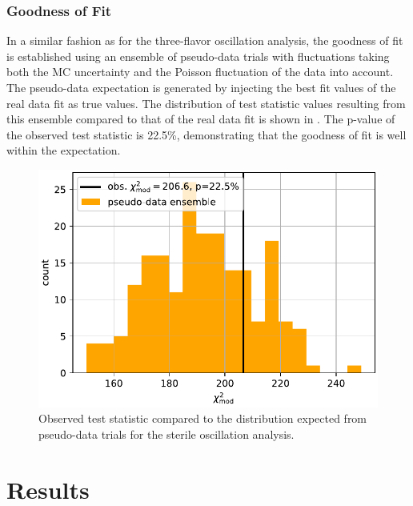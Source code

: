 \subsubsection{Goodness of Fit}
In a similar fashion as for the three-flavor oscillation analysis, the goodness of fit is established using an ensemble of pseudo-data trials with fluctuations taking both the MC uncertainty and the Poisson fluctuation of the data into account.
The pseudo-data expectation is generated by injecting the best fit values of the real data fit as true values.
The distribution of test statistic values resulting from this ensemble compared to that of the real data fit is shown in .
The p-value of the observed test statistic is 22.5\%, demonstrating that the goodness of fit is well within the expectation.

\begin{figure}
    \centering
    \includegraphics[width=0.8\linewidth]{figures/measurement/sterile_analysis/results/compare_ts_to_ensemble_REAL_DATA_FIT_v12_ext_holeice.pdf}
    \caption{Observed test statistic compared to the distribution expected from pseudo-data trials for the sterile oscillation analysis.}
    \label{fig:sterile-modchi2-ensemble-comparison}
\end{figure}

\section{Results}

